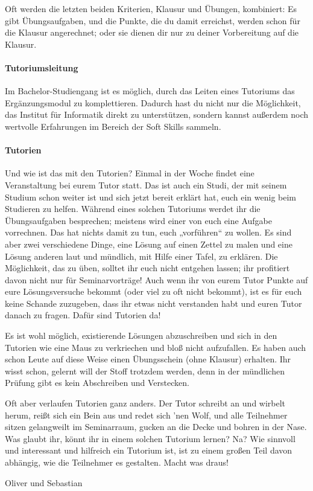 Oft werden die letzten beiden Kriterien, Klausur und Übungen, kombiniert: Es gibt Übungsaufgaben, und die Punkte, die du damit erreichst, werden schon für die Klausur angerechnet; oder sie dienen dir nur zu deiner Vorbereitung auf die Klausur.


\paragraph{Tutoriumsleitung} Im Bachelor-Studiengang ist es möglich, durch das Leiten eines Tutoriums das Ergänzungsmodul zu komplettieren. Dadurch hast du nicht nur die Möglichkeit, das Institut für Informatik direkt zu unterstützen, sondern kannst außerdem noch wertvolle Erfahrungen im Bereich der Soft Skills sammeln.


\paragraph{Tutorien} Und wie ist das mit den Tutorien? Einmal in der Woche findet eine Veranstaltung bei eurem Tutor statt. Das ist auch ein Studi, der mit seinem Studium schon weiter ist und sich jetzt bereit erklärt hat, euch ein wenig beim Studieren zu helfen. Während eines solchen Tutoriums werdet ihr die Übungsaufgaben besprechen; meistens wird einer von euch eine Aufgabe vorrechnen. Das hat nichts damit zu tun, euch „vorführen“ zu wollen. Es sind aber zwei verschiedene Dinge, eine Lösung auf einen Zettel zu malen und eine Lösung anderen laut und mündlich, mit Hilfe einer Tafel, zu erklären. Die Möglichkeit, das zu üben, solltet ihr euch nicht entgehen lassen; ihr profitiert davon nicht nur für Seminarvorträge! Auch wenn ihr von eurem Tutor Punkte auf eure Lösungsversuche bekommt (oder viel zu oft nicht bekommt), ist es für euch keine Schande zuzugeben, dass ihr etwas nicht verstanden habt und euren Tutor danach zu fragen. Dafür sind Tutorien da!

Es ist wohl möglich, existierende Lösungen abzuschreiben und sich in den Tutorien wie eine Maus zu verkriechen und bloß nicht aufzufallen. Es haben auch schon Leute auf diese Weise einen Übungsschein (ohne Klausur) erhalten. Ihr wisst schon, gelernt will der Stoff trotzdem werden, denn in der mündlichen Prüfung gibt es kein Abschreiben und Verstecken.


Oft aber verlaufen Tutorien ganz anders. Der Tutor schreibt an und wirbelt herum, reißt sich ein Bein aus und redet sich ’nen Wolf, und alle Teilnehmer sitzen gelangweilt im Seminarraum, gucken an die Decke und bohren in der Nase. Was glaubt ihr, könnt ihr in einem solchen Tutorium lernen? Na? Wie sinnvoll und interessant und hilfreich ein Tutorium ist, ist zu einem großen Teil davon abhängig, wie die Teilnehmer es gestalten. Macht was draus!

\begin{flushright}Oliver und Sebastian\end{flushright}